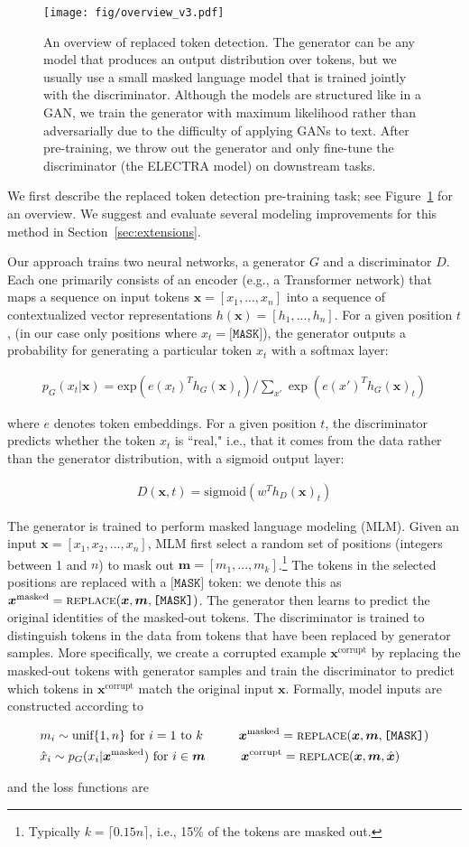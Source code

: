 \documentclass{article}
\newcommand{\alns}[1] {
	\begin{align*} #1 \end{align*}
}
\newcommand{\bmx}{\bm{x}^\text{masked}}
\newcommand{\bfx}{\bm{x}^\text{corrupt}}
\newcommand{\bx}{\bm{x}}
\newcommand{\hbx}{\hat{\bm{x}}}
\newcommand{\I}{\bm{m}}
\newcommand{\replace}[3] {
    \textsc{replace}(#1, #2, #3)
}
\begin{document}
\begin{figure}[tb]
\begin{center}
\texttt{[image: fig/overview\_v3.pdf]}
\end{center}
\caption{An overview of replaced token detection. The generator can be any model that produces an output distribution over tokens, but we usually use a small masked language model that is trained jointly with the discriminator.
Although the models are structured like in a GAN, we train the generator with maximum likelihood rather than adversarially due to the difficulty of applying GANs to text.
After pre-training, we throw out the generator and only fine-tune the discriminator (the ELECTRA model) on downstream tasks.
}
\label{fig:overview}
\end{figure}

We first describe the  replaced token detection pre-training task; see Figure~\ref{fig:overview} for an overview.
We suggest and evaluate several modeling improvements for this method in Section~\ref{sec:extensions}.

Our approach trains two neural networks, a generator $G$ and a discriminator $D$.
Each one primarily consists of an encoder (e.g., a Transformer network) that maps a sequence on input tokens $\bx = [x_1, ..., x_n]$ into a sequence of contextualized vector representations
$h(\bx) = [h_1, ..., h_n]$.
For a given position $t$, (in our case only positions where $x_t = \texttt{[MASK]}$), 
the generator outputs a probability for generating a particular token $x_t$ with a softmax layer: 
\alns{
 p_G(x_t | \bx) = \text{exp}\left(e(x_t)^T h_G(\bx)_t\right) / \sum_{x'} \exp\left(e(x')^T h_G(\bx)_t\right)
} 
where $e$ denotes token embeddings. 
For a given position $t$, the discriminator predicts whether the token $x_t$ is ``real," i.e., that it comes from the data rather than the generator distribution, with a sigmoid output layer: 
\alns{ 
    D(\bx, t) = \text{sigmoid}(w^T h_D(\bx)_t)
}
The generator is trained to perform masked language modeling (MLM). Given an input $\bx = [x_1, x_2, ..., x_n]$, MLM first select a random set of positions (integers between 1 and $n$) to mask out $\I = [m_1, ..., m_k]$.\footnote{Typically $k = \lceil0.15n\rceil$, i.e., 15\% of the tokens are masked out.}
The tokens in the selected positions are replaced with a $\texttt{[MASK]}$ token: we denote this as $\bmx = \replace{\bx}{\I}{\texttt{[MASK]}}$.
The generator then learns to predict the original identities of the masked-out tokens. 
The discriminator is trained to distinguish tokens in the data from tokens that have been replaced by generator samples.
More specifically, we create a corrupted example $\bfx$ by replacing the masked-out tokens with generator samples and train the discriminator to predict which tokens in $\bfx$ match the original input $\bx$. Formally, model inputs are constructed according to
\alns{
&m_i \sim \text{unif}\{1, n\} \text{ for } i=1 \text{ to } k \hspace{10mm} 
\bmx = \replace{\bx}{\I}{\texttt{[MASK]}} \\
&\hat{x}_i \sim p_G(x_i | \bmx) \text{ for } i \in \I \hspace{10mm}
\bfx = \replace{\bx}{\I}{\hbx} 
}
and the loss functions are
\end{document}
